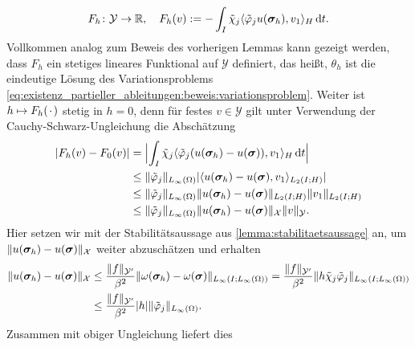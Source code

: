\documentclass[../main.tex]{subfiles}
\begin{document}
\begin{Satz}
\begin{Beweis}
\begin{equation}
            F_{h} \colon \mathcal Y \to \mathbb{R}, \quad F_{h}(v) := - \int_{I} \tilde{\chi}_{j} \skp{\tilde{\varphi}_{j}  u(\bm\sigma_{h})}{v_{1}}{H} \diff t.
        \end{equation}
        Vollkommen analog zum Beweis des vorherigen Lemmas kann gezeigt werden, dass $F_{h}$ ein stetiges lineares Funktional auf $\mathcal Y$ definiert, das heißt, $\theta_{h}$ ist die eindeutige Lösung des Variationsproblems \cref{eq:existenz_partieller_ableitungen:beweis:variationsproblem}.
        Weiter ist $h \mapsto F_{h}(\blank)$ stetig in $h = 0$, denn für festes $v \in \mathcal Y$ gilt unter Verwendung der Cauchy-Schwarz-Ungleichung die Abschätzung
        \begin{align}
            \abs{F_{h}(v) - F_{0}(v)}
            &= \abs[\Big]{\int_{I} \tilde{\chi}_{j} \skp{\tilde{\varphi}_{j}  (u(\bm\sigma_{h}) - u(\bm\sigma))}{v_{1}}{H} \diff t }
            \\&\leq \norm{\tilde{\varphi}_{j}}_{L_{\infty}(\Omega)} \abs{\skp{u(\bm\sigma_{h}) - u(\bm\sigma)}{v_{1}}{L_{2}(I; H)} }
            \\&\leq \norm{\tilde{\varphi}_{j}}_{L_{\infty}(\Omega)} \norm{u(\bm\sigma_{h}) - u(\bm\sigma)}_{L_{2}(I; H)} \norm{v_{1}}_{L_{2}(I; H)}
            \\&\leq \norm{\tilde{\varphi}_{j}}_{L_{\infty}(\Omega)} \norm{u(\bm\sigma_{h}) - u(\bm\sigma)}_{\mathcal X} \norm{v}_{\mathcal Y}.
        \end{align}
        Hier setzen wir mit der Stabilitätsaussage aus \cref{lemma:stabilitaetsaussage} an, um $\norm{u(\bm\sigma_{h}) - u(\bm\sigma)}_{\mathcal X}$ weiter abzuschätzen und erhalten
        \begin{equation}
            \begin{aligned}
                \norm{u(\bm\sigma_{h}) - u(\bm\sigma)}_{\mathcal X}
                &\leq \frac{\norm{f}_{\mathcal Y'}}{\beta^{2}} \norm{\omega(\bm\sigma_{h}) - \omega(\bm\sigma)}_{L_{\infty}(I; L_{\infty}(\Omega))}
                = \frac{\norm{f}_{\mathcal Y'}}{\beta^{2}} \norm{h \tilde{\chi}_{j} \tilde{\varphi}_{j} }_{L_{\infty}(I; L_{\infty}(\Omega))}
                \\&\leq \frac{\norm{f}_{\mathcal Y'}}{\beta^{2}} \abs{h} \norm{\tilde{\varphi}_{j}}_{L_{\infty}(\Omega)}.
            \end{aligned}
        \end{equation}
        Zusammen mit obiger Ungleichung liefert dies
        \begin{equation}

\end{equation}
\end{Beweis}
\end{Satz}
\end{document}

